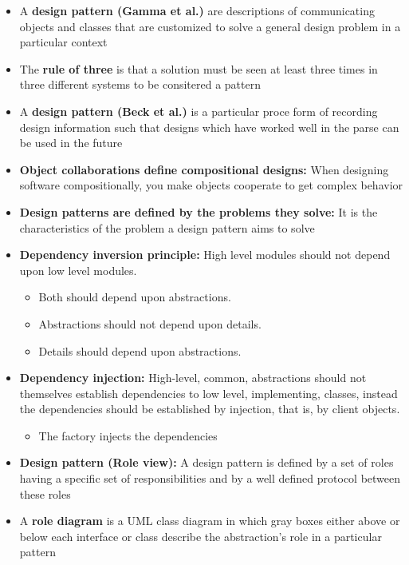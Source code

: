 \documentclass[11pt]{article}
\providecommand{\tightlist}{%
      \setlength{\itemsep}{0pt}\setlength{\parskip}{0pt}}
\begin{document}
\begin{itemize}
\tightlist
\item
  A \textbf{design pattern (Gamma et al.)} are descriptions of
  communicating objects and classes that are customized to solve a
  general design problem in a particular context
\item
  The \textbf{rule of three} is that a solution must be seen at least
  three times in three different systems to be consitered a pattern
\item
  A \textbf{design pattern (Beck et al.)} is a particular proce form of
  recording design information such that designs which have worked well
  in the parse can be used in the future
\item
  \textbf{Object collaborations define compositional designs:} When
  designing software compositionally, you make objects cooperate to get
  complex behavior
\item
  \textbf{Design patterns are defined by the problems they solve:} It is
  the characteristics of the problem a design pattern aims to solve
\item
  \textbf{Dependency inversion principle:} High level modules should not
  depend upon low level modules.

  \begin{itemize}
  \tightlist
  \item
    Both should depend upon abstractions.
  \item
    Abstractions should not depend upon details.
  \item
    Details should depend upon abstractions.
  \end{itemize}
\item
  \textbf{Dependency injection:} High-level, common, abstractions should
  not themselves establish dependencies to low level, implementing,
  classes, instead the dependencies should be established by injection,
  that is, by client objects.

  \begin{itemize}
  \tightlist
  \item
    The factory injects the dependencies
  \end{itemize}
\item
  \textbf{Design pattern (Role view):} A design pattern is defined by a
  set of roles having a specific set of responsibilities and by a well
  defined protocol between these roles
\item
  A \textbf{role diagram} is a UML class diagram in which gray boxes
  either above or below each interface or class describe the
  abstraction's role in a particular pattern


\end{itemize}
\end{document}
